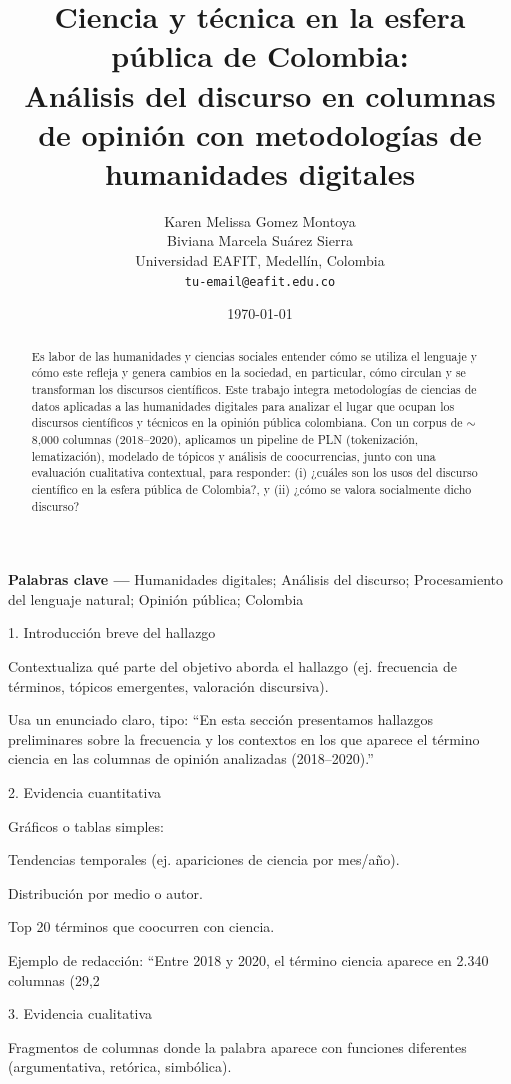 \documentclass[11pt,a4paper]{article}
\title{Ciencia y técnica en la esfera pública de Colombia: \\
	Análisis del discurso en columnas de opinión con metodologías de humanidades digitales}
\author{
	Karen Melissa Gomez Montoya\\
	Biviana Marcela Suárez Sierra\\
	\small Universidad EAFIT, Medellín, Colombia\\
	\small \texttt{tu-email@eafit.edu.co}
}
\date{\today}
\newcommand{\keywords}[1]{\par\noindent\textbf{Palabras clave —} #1}
\newcommand{\JEL}[1]{\par\noindent\textbf{Clasificación —} #1}
\begin{document}
	\maketitle
	
	\begin{abstract}
		Es labor de las humanidades y ciencias sociales entender cómo se utiliza el lenguaje y cómo este refleja y genera cambios en la sociedad, en particular, cómo circulan y se transforman los discursos científicos. Este trabajo integra metodologías de ciencias de datos aplicadas a las humanidades digitales para analizar el lugar que ocupan los discursos científicos y técnicos en la opinión pública colombiana. Con un corpus de $\sim$8{,}000 columnas (2018--2020), aplicamos un pipeline de PLN (tokenización, lematización), modelado de tópicos y análisis de coocurrencias, junto con una evaluación cualitativa contextual, para responder: (i) ¿cuáles son los usos del discurso científico en la esfera pública de Colombia?, y (ii) ¿cómo se valora socialmente dicho discurso?
	\end{abstract}
	
	\keywords{Humanidades digitales; Análisis del discurso; Procesamiento del lenguaje natural; Opinión pública; Colombia}
	
	1. Introducción breve del hallazgo
	
	Contextualiza qué parte del objetivo aborda el hallazgo (ej. frecuencia de términos, tópicos emergentes, valoración discursiva).
	
	Usa un enunciado claro, tipo:
	“En esta sección presentamos hallazgos preliminares sobre la frecuencia y los contextos en los que aparece el término ciencia en las columnas de opinión analizadas (2018–2020).”
	
	2. Evidencia cuantitativa
	
	Gráficos o tablas simples:
	
	Tendencias temporales (ej. apariciones de ciencia por mes/año).
	
	Distribución por medio o autor.
	
	Top 20 términos que coocurren con ciencia.
	
	Ejemplo de redacción:
	“Entre 2018 y 2020, el término ciencia aparece en 2.340 columnas (29,2%
	
	3. Evidencia cualitativa
	
	Fragmentos de columnas donde la palabra aparece con funciones diferentes (argumentativa, retórica, simbólica).
	
\end{document}
